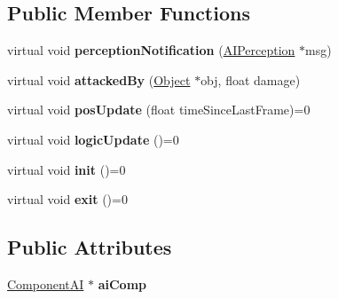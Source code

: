 \subsection*{\-Public \-Member \-Functions}
\begin{DoxyCompactItemize}
\item 
\hypertarget{classAIHandler_ac280ee1dde1c132f15bbdd021a44719d}{
virtual void {\bfseries perception\-Notification} (\hyperlink{classAIPerception}{\-A\-I\-Perception} $\ast$msg)}
\label{d0/d2d/classAIHandler_ac280ee1dde1c132f15bbdd021a44719d}

\item 
\hypertarget{classAIHandler_a39b49ccde4d584df53b361bb7b6c2f3e}{
virtual void {\bfseries attacked\-By} (\hyperlink{classObject}{\-Object} $\ast$obj, float damage)}
\label{d0/d2d/classAIHandler_a39b49ccde4d584df53b361bb7b6c2f3e}

\item 
\hypertarget{classAIHandler_a70d87fbd41aa05a8dc0b5da63493633d}{
virtual void {\bfseries pos\-Update} (float time\-Since\-Last\-Frame)=0}
\label{d0/d2d/classAIHandler_a70d87fbd41aa05a8dc0b5da63493633d}

\item 
\hypertarget{classAIHandler_ae60030ae91b367e8ca3a444fedfe2fb3}{
virtual void {\bfseries logic\-Update} ()=0}
\label{d0/d2d/classAIHandler_ae60030ae91b367e8ca3a444fedfe2fb3}

\item 
\hypertarget{classAIHandler_a85ee4d9b6c24a7f44abe0adfc9b1baf5}{
virtual void {\bfseries init} ()=0}
\label{d0/d2d/classAIHandler_a85ee4d9b6c24a7f44abe0adfc9b1baf5}

\item 
\hypertarget{classAIHandler_aeca648941d1ff91c42f2abe11aa1479e}{
virtual void {\bfseries exit} ()=0}
\label{d0/d2d/classAIHandler_aeca648941d1ff91c42f2abe11aa1479e}

\end{DoxyCompactItemize}
\subsection*{\-Public \-Attributes}
\begin{DoxyCompactItemize}
\item 
\hypertarget{classAIHandler_aa8fdc1389632955e2d91a3d296f8b688}{
\hyperlink{classComponentAI}{\-Component\-A\-I} $\ast$ {\bfseries ai\-Comp}}
\label{d0/d2d/classAIHandler_aa8fdc1389632955e2d91a3d296f8b688}

\end{DoxyCompactItemize}



